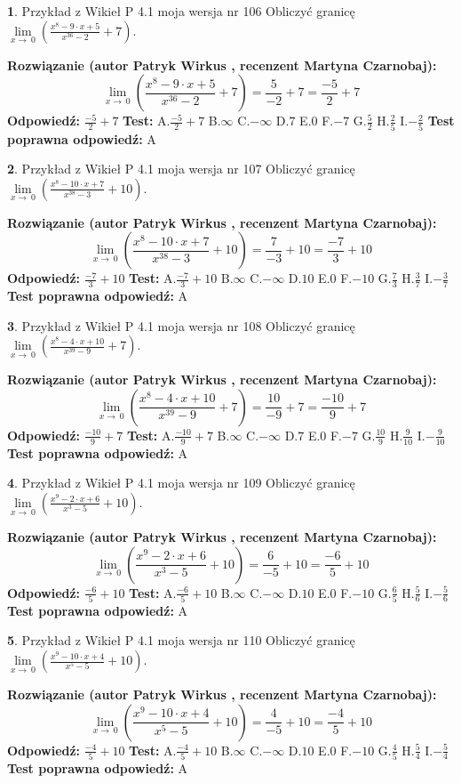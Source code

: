\documentclass[12pt, a4paper]{article}
\theoremstyle{definition} %
\newtheorem{zad}{}
\newcommand{\zadStart}[1]{\begin{zad}#1\newline}
\newcommand{\zadStop}{\end{zad}}
\newcommand{\rozwStart}[2]{\noindent \textbf{Rozwiązanie (autor #1 , recenzent #2): }\newline}
\newcommand{\rozwStop}{\newline}
\newcommand{\odpStart}{\noindent \textbf{Odpowiedź:}\newline}
\newcommand{\odpStop}{\newline}
\newcommand{\testStart}{\noindent \textbf{Test:}\newline}
\newcommand{\testStop}{\newline}
\newcommand{\kluczStart}{\noindent \textbf{Test poprawna odpowiedź:}\newline}
\newcommand{\kluczStop}{\newline}
\begin{document}
\zadStart{Przykład z Wikieł P 4.1 moja wersja nr 106}
Obliczyć granicę $\lim\limits_{x\to\ 0}(\frac{x^{8}-9 \cdot x +5}{x^{36}-2}+7)$.
\zadStop
\rozwStart{Patryk Wirkus}{Martyna Czarnobaj}
$$\lim\limits_{x\to\ 0}(\frac{x^{8}-9 \cdot x +5}{x^{36}-2}+7)=\frac{5}{-2}+7=\frac{-5}{2}+7$$
\rozwStop
\odpStart
$\frac{-5}{2}+7$
\odpStop
\testStart
A.$\frac{-5}{2}+7$
B.$\infty$
C.$-\infty$
D.$7$
E.$0$
F.$-7$
G.$\frac{5}{2}$
H.$\frac{2}{5}$
I.$-\frac{2}{5}$
\testStop
\kluczStart
A
\kluczStop



\zadStart{Przykład z Wikieł P 4.1 moja wersja nr 107}
Obliczyć granicę $\lim\limits_{x\to\ 0}(\frac{x^{8}-10 \cdot x +7}{x^{38}-3}+10)$.
\zadStop
\rozwStart{Patryk Wirkus}{Martyna Czarnobaj}
$$\lim\limits_{x\to\ 0}(\frac{x^{8}-10 \cdot x +7}{x^{38}-3}+10)=\frac{7}{-3}+10=\frac{-7}{3}+10$$
\rozwStop
\odpStart
$\frac{-7}{3}+10$
\odpStop
\testStart
A.$\frac{-7}{3}+10$
B.$\infty$
C.$-\infty$
D.$10$
E.$0$
F.$-10$
G.$\frac{7}{3}$
H.$\frac{3}{7}$
I.$-\frac{3}{7}$
\testStop
\kluczStart
A
\kluczStop



\zadStart{Przykład z Wikieł P 4.1 moja wersja nr 108}
Obliczyć granicę $\lim\limits_{x\to\ 0}(\frac{x^{8}-4 \cdot x +10}{x^{39}-9}+7)$.
\zadStop
\rozwStart{Patryk Wirkus}{Martyna Czarnobaj}
$$\lim\limits_{x\to\ 0}(\frac{x^{8}-4 \cdot x +10}{x^{39}-9}+7)=\frac{10}{-9}+7=\frac{-10}{9}+7$$
\rozwStop
\odpStart
$\frac{-10}{9}+7$
\odpStop
\testStart
A.$\frac{-10}{9}+7$
B.$\infty$
C.$-\infty$
D.$7$
E.$0$
F.$-7$
G.$\frac{10}{9}$
H.$\frac{9}{10}$
I.$-\frac{9}{10}$
\testStop
\kluczStart
A
\kluczStop



\zadStart{Przykład z Wikieł P 4.1 moja wersja nr 109}
Obliczyć granicę $\lim\limits_{x\to\ 0}(\frac{x^{9}-2 \cdot x +6}{x^{3}-5}+10)$.
\zadStop
\rozwStart{Patryk Wirkus}{Martyna Czarnobaj}
$$\lim\limits_{x\to\ 0}(\frac{x^{9}-2 \cdot x +6}{x^{3}-5}+10)=\frac{6}{-5}+10=\frac{-6}{5}+10$$
\rozwStop
\odpStart
$\frac{-6}{5}+10$
\odpStop
\testStart
A.$\frac{-6}{5}+10$
B.$\infty$
C.$-\infty$
D.$10$
E.$0$
F.$-10$
G.$\frac{6}{5}$
H.$\frac{5}{6}$
I.$-\frac{5}{6}$
\testStop
\kluczStart
A
\kluczStop



\zadStart{Przykład z Wikieł P 4.1 moja wersja nr 110}
Obliczyć granicę $\lim\limits_{x\to\ 0}(\frac{x^{9}-10 \cdot x +4}{x^{5}-5}+10)$.
\zadStop
\rozwStart{Patryk Wirkus}{Martyna Czarnobaj}
$$\lim\limits_{x\to\ 0}(\frac{x^{9}-10 \cdot x +4}{x^{5}-5}+10)=\frac{4}{-5}+10=\frac{-4}{5}+10$$
\rozwStop
\odpStart
$\frac{-4}{5}+10$
\odpStop
\testStart
A.$\frac{-4}{5}+10$
B.$\infty$
C.$-\infty$
D.$10$
E.$0$
F.$-10$
G.$\frac{4}{5}$
H.$\frac{5}{4}$
I.$-\frac{5}{4}$
\testStop
\kluczStart
A
\kluczStop
\end{document}
